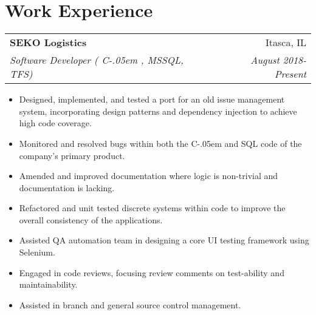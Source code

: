 \documentclass[letterpaper,11pt]{article}
\makeatletter
\newcommand{\resumeItem}[2]{
    \vspace{-2pt}
    \item\small{
        \textbf{#1}{ #2 \vspace{-2pt}}
    }
}
\newcommand{\resumeSubheading}[4]{
        \begin{tabular*}{0.97\textwidth}{l@{\extracolsep{\fill}}r}
            \textbf{#1} & #2 \\
            \textit{\small#3} & \textit{\small #4} \\
        \end{tabular*}
}
\newcommand{\resumeSubHeadingListStart}{}
\newcommand{\resumeSubHeadingListEnd}{}
\newcommand{\resumeItemListStart}{\begin{itemize}}
\newcommand{\resumeItemListEnd}{\end{itemize}}
\newcommand{\Csharp}{%
  {\settoheight{\dimen0}{C}C\kern-.05em \resizebox{!}{\dimen0}{\raisebox{\depth}{\#}}}}
\makeatother
\begin{document}
\section{\textbf{Work Experience}}
    \resumeSubHeadingListStart
        \resumeSubheading
            {SEKO Logistics}{Itasca, IL}
            {Software Developer (\Csharp, MSSQL, TFS)}{August 2018-Present}
            \resumeItemListStart
                \resumeItem{}
                    {
                        Designed, implemented, and tested a port for
                        an old issue management system, incorporating
                        design patterns and dependency injection to achieve high code coverage.
                    }
                \resumeItem{}
                    {
                        Monitored and resolved bugs within both the \Csharp \space and SQL code of the company's primary product.
                    }
                \resumeItem{}
                    {
                        Amended and improved documentation where logic
                        is non-trivial and documentation is lacking.
                    }
                \resumeItem{}
                    {
                        Refactored and unit tested discrete systems 
                        within code to improve the overall consistency 
                        of the applications.
                    }
                \resumeItem{}
                    {
                        Assisted QA automation team in designing a core UI testing framework using Selenium.
                    }
                \resumeItem{}
                    {
                        Engaged in code reviews,
                        focusing review comments on test-ability and maintainability.
                    }
                \resumeItem{}
                    {
                        Assisted in branch and general source control management.
                    }
            \resumeItemListEnd
    \resumeSubHeadingListEnd
\end{document}
